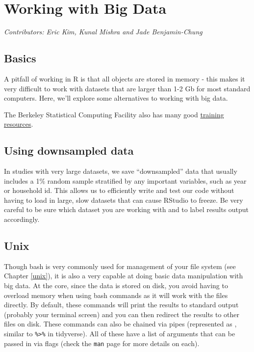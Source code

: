 \documentclass[]{book}
\begin{document}
\hypertarget{bigdata}{%
\chapter{Working with Big Data}\label{bigdata}}

\emph{Contributors: Eric Kim, Kunal Mishra and Jade Benjamin-Chung}

\hypertarget{basics-1}{%
\section{Basics}\label{basics-1}}

A pitfall of working in R is that all objects are stored in memory - this makes it very difficult to work with datasets that are larger than 1-2 Gb for most standard computers. Here, we'll explore some alternatives to working with big data.

The Berkeley Statistical Computing Facility also has many good \href{http://statistics.berkeley.edu/computing/training}{training resources}.

\hypertarget{using-downsampled-data}{%
\section{Using downsampled data}\label{using-downsampled-data}}

In studies with very large datasets, we save ``downsampled'' data that usually includes a 1\% random sample stratified by any important variables, such as year or household id. This allows us to efficiently write and test our code without having to load in large, slow datasets that can cause RStudio to freeze. Be very careful to be sure which dataset you are working with and to label results output accordingly.

\hypertarget{big-data-unix}{%
\section{Unix}\label{big-data-unix}}

Though bash is very commonly used for management of your file system (see Chapter \ref{unix}), it is also a very capable at doing basic data manipulation with big data. At the core, since the data is stored on disk, you avoid having to overload memory when using bash commands as it will work with the files directly. By default, these commands will print the results to standard output (probably your terminal screen) and you can then redirect the results to other files on disk. These commands can also be chained via pipes (represented as \texttt{\textbar{}}, similar to \texttt{\%\textgreater{}\%} in tidyverse). All of these have a list of arguments that can be passed in via flags (check the \texttt{man} page for more details on each).
\end{document}
